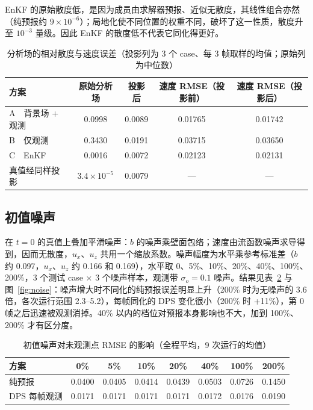 \documentclass[10.5pt,a4paper]{article}
\begin{document}
EnKF 的原始散度低，是因为成员由求解器预报、近似无散度，其线性组合亦然（纯预报约 $9\times10^{-6}$）；局地化使不同位置的权重不同，破坏了这一性质，散度升至 $10^{-3}$ 量级。因此 EnKF 的散度低不代表它同化得更好。

\begin{table}[htbp]\centering\small\caption{分析场的相对散度与速度误差（投影列为 3 个 case、每 3 帧取样的均值；原始列为中位数）}\label{tab:div}
\begin{tabular}{@{}lcccc@{}}\toprule
方案 & 原始分析场 & 投影后 & 速度 RMSE（投影前） & 速度 RMSE（投影后） \\ \midrule
A\ \ 背景场 + 观测 & 0.0998 & 0.0089 & 0.01765 & 0.01742 \\
B\ \ 仅观测 & 0.3430 & 0.0191 & 0.03715 & 0.03650 \\
C\ \ EnKF & 0.0016 & 0.0072 & 0.02123 & 0.02131 \\ \midrule
真值经同样投影 & $3.4\times10^{-5}$ & 0.0079 & --- & --- \\ \bottomrule\end{tabular}\end{table}

\subsection{初值噪声}
在 $t=0$ 的真值上叠加平滑噪声：$b$ 的噪声乘壁面包络；速度由流函数噪声求导得到，因而无散度，$u_x$、$u_z$ 共用一个缩放系数。噪声幅度为水平乘参考标准差（$b$ 约 0.097，$u_x$、$u_z$ 约 0.166 和 0.169），水平取 0、5\%、10\%、20\%、40\%、100\%、200\%，3 个测试 case $\times$ 3 个噪声样本，观测带 $\sigma_o=0.1$ 噪声。结果见表~\ref{tab:noise} 与图~\ref{fig:noise}：噪声增大时不同化的纯预报误差明显上升（200\% 时为无噪声的 3.6 倍，各次运行范围 2.3--5.2），每帧同化的 DPS 变化很小（200\% 时 +11\%），第 0 帧之后迅速被观测消掉。40\% 以内的档位对预报本身影响也不大，加到 100\%、200\% 才有区分度。

\begin{table}[htbp]\centering\small\caption{初值噪声对未观测点 RMSE 的影响（全程平均，9 次运行的均值）}\label{tab:noise}
\begin{tabular}{@{}lccccccc@{}}\toprule
方案 & 0\% & 5\% & 10\% & 20\% & 40\% & 100\% & 200\% \\ \midrule
纯预报 & 0.0400 & 0.0405 & 0.0414 & 0.0439 & 0.0503 & 0.0726 & 0.1450 \\
DPS 每帧观测 & 0.0171 & 0.0171 & 0.0171 & 0.0171 & 0.0172 & 0.0176 & 0.0190 \\ \bottomrule\end{tabular}\end{table}
\end{document}
